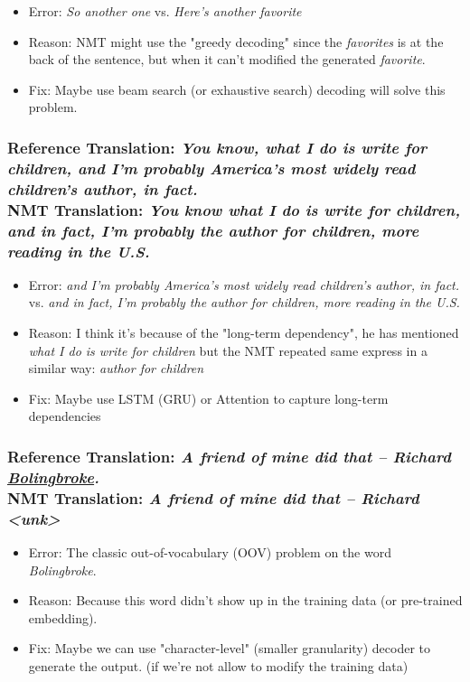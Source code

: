 \documentclass[12pt, letterpaper]{article}
\begin{document}
\begin{itemize}
  \item Error: \textit{So another one} vs. \textit{Here’s another favorite}
  \item Reason: NMT might use the "greedy decoding" since the \textit{favorites} is at the back of the sentence, but when it can't modified the generated \textit{favorite}.
  \item Fix: Maybe use beam search (or exhaustive search) decoding will solve this problem.
\end{itemize}

\subsubsection{\textbf{Reference Translation}: \textit{You know, what I do is write for children, and I’m probably America’s most widely read children’s author, in fact.} \\ \textbf{NMT Translation}: \textit{You know what I do is write for children, and in fact, I’m probably the author for children, more reading in the U.S.}}

\begin{itemize}
  \item Error: \textit{and I’m probably America’s most widely read children’s author, in fact.} vs. \textit{and in fact, I’m probably the author for children, more reading in the U.S.}
  \item Reason: I think it's because of the "long-term dependency", he has mentioned \textit{what I do is write for children} but the NMT repeated same express in a similar way: \textit{author for children}
  \item Fix: Maybe use LSTM (GRU) or Attention to capture long-term dependencies
\end{itemize}

\subsubsection{\textbf{Reference Translation}: \textit{A friend of mine did that – Richard \underline{Bolingbroke}.} \\ \textbf{NMT Translation}: \textit{A friend of mine did that – Richard <unk>}}

\begin{itemize}
  \item Error: The classic out-of-vocabulary (OOV) problem on the word \textit{Bolingbroke}.
  \item Reason: Because this word didn't show up in the training data (or pre-trained embedding).
  \item Fix: Maybe we can use "character-level" (smaller granularity) decoder to generate the output. (if we're not allow to modify the training data)
\end{itemize}
\end{document}

